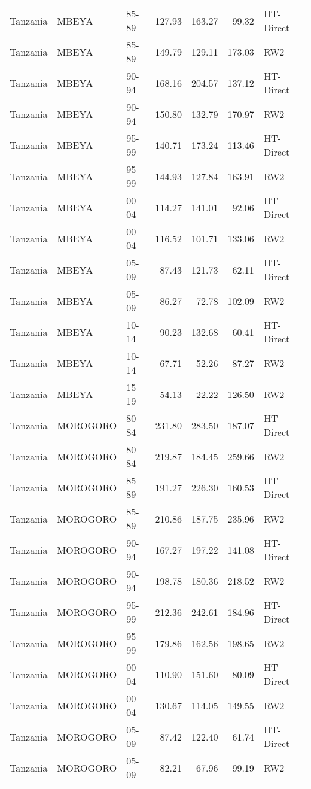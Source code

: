 \begin{longtable}{lllrrrl}
  Tanzania & MBEYA & 85-89 & 127.93 & 163.27 & 99.32 & HT-Direct \\ 
  Tanzania & MBEYA & 85-89 & 149.79 & 129.11 & 173.03 & RW2 \\ 
  Tanzania & MBEYA & 90-94 & 168.16 & 204.57 & 137.12 & HT-Direct \\ 
  Tanzania & MBEYA & 90-94 & 150.80 & 132.79 & 170.97 & RW2 \\ 
  Tanzania & MBEYA & 95-99 & 140.71 & 173.24 & 113.46 & HT-Direct \\ 
  Tanzania & MBEYA & 95-99 & 144.93 & 127.84 & 163.91 & RW2 \\ 
  Tanzania & MBEYA & 00-04 & 114.27 & 141.01 & 92.06 & HT-Direct \\ 
  Tanzania & MBEYA & 00-04 & 116.52 & 101.71 & 133.06 & RW2 \\ 
  Tanzania & MBEYA & 05-09 & 87.43 & 121.73 & 62.11 & HT-Direct \\ 
  Tanzania & MBEYA & 05-09 & 86.27 & 72.78 & 102.09 & RW2 \\ 
  Tanzania & MBEYA & 10-14 & 90.23 & 132.68 & 60.41 & HT-Direct \\ 
  Tanzania & MBEYA & 10-14 & 67.71 & 52.26 & 87.27 & RW2 \\ 
  Tanzania & MBEYA & 15-19 & 54.13 & 22.22 & 126.50 & RW2 \\ 
  Tanzania & MOROGORO & 80-84 & 231.80 & 283.50 & 187.07 & HT-Direct \\ 
  Tanzania & MOROGORO & 80-84 & 219.87 & 184.45 & 259.66 & RW2 \\ 
  Tanzania & MOROGORO & 85-89 & 191.27 & 226.30 & 160.53 & HT-Direct \\ 
  Tanzania & MOROGORO & 85-89 & 210.86 & 187.75 & 235.96 & RW2 \\ 
  Tanzania & MOROGORO & 90-94 & 167.27 & 197.22 & 141.08 & HT-Direct \\ 
  Tanzania & MOROGORO & 90-94 & 198.78 & 180.36 & 218.52 & RW2 \\ 
  Tanzania & MOROGORO & 95-99 & 212.36 & 242.61 & 184.96 & HT-Direct \\ 
  Tanzania & MOROGORO & 95-99 & 179.86 & 162.56 & 198.65 & RW2 \\ 
  Tanzania & MOROGORO & 00-04 & 110.90 & 151.60 & 80.09 & HT-Direct \\ 
  Tanzania & MOROGORO & 00-04 & 130.67 & 114.05 & 149.55 & RW2 \\ 
  Tanzania & MOROGORO & 05-09 & 87.42 & 122.40 & 61.74 & HT-Direct \\ 
  Tanzania & MOROGORO & 05-09 & 82.21 & 67.96 & 99.19 & RW2 \\ 

\end{longtable}
